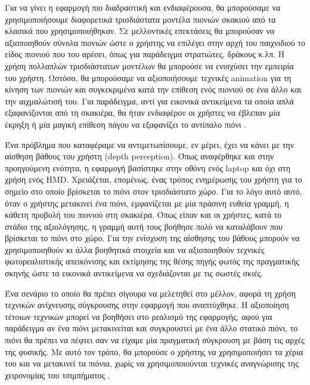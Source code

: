 Για να γίνει η εφαρμογή πιο διαδραστική και ενδιαφέρουσα, θα μπορούσαμε να χρησιμοποιήσουμε διαφορετικά τρισδιάστατα μοντέλα πιονιών σκακιού από τα κλασικά που χρησιμοποιήθηκαν. Σε μελλοντικές επεκτάσεις θα μπορούσαν να αξιοποιηθούν σύνολα πιονιών ώστε ο χρήστης να επιλέγει στην αρχή του παιχνιδιού το είδος πιονιού που του αρέσει, όπως για παράδειγμα στρατιώτες, δράκους κ.λπ.
Η χρήση πολλαπλών τρισδιάστατων μοντέλων θα μπορούσε να ενισχύσει την εμπειρία του χρήστη. Ωστόσο, θα μπορούσαμε να αξιοποιήσουμε τεχνικές animation για τη κίνηση των πιονιών και συγκεκριμένα κατά την επίθεση ενός πιονιού σε ένα άλλο και την αιχμαλώτισή του. Για παράδειγμα, αντί για εικονικά αντικείμενα τα οποία απλά εξαφανίζονται από τη σκακιέρα, θα ήταν ενδιαφέρον οι χρήστες να έβλεπαν μία έκρηξη ή μία μαγική επίθεση πάγου να εξαφανίζει το αντίπαλο πιόνι \cite{harrypotter}.





Ένα πρόβλημα που καταφέραμε να αντιμετωπίσουμε, εν μέρει, έχει να κάνει με την αίσθηση βάθους του χρήστη (depth perception). Όπως αναφέρθηκε και στην προηγούμενη ενότητα, η εφαρμογή βασίστηκε στην οθόνη ενός laptop και όχι στη χρήση ενός HMD. Χρειάζεται, επομένως, ένας τρόπος ενημέρωσης του χρήστη για το σημείο στο οποίο βρίσκεται το πιόνι στον τρισδιάστατο χώρο. Για το λόγο αυτό αυτό, όταν ο χρήστης μετακινεί ένα πιόνι, εμφανίζεται με μία πράσινη ευθεία γραμμή, η κάθετη προβολή του πιονιού στη σκακιέρα. Όπως είπαν και οι χρήστες, κατά το στάδιο της αξιολόγησης, η γραμμή αυτή τους βοήθησε πολύ να καταλάβουν που βρίσκεται το πιόνι στο χώρο. Για την ενίσχυση της αίσθησης του βάθους μπορούν να χρησιμοποιηθούν κι άλλα βοηθητικά στοιχεία και να αξιοποιηθούν τεχνικές φωτορεαλιστικής απεικόνισης και εκτίμησης της θέσης πηγής φωτός της πραγματικής σκηνής \cite{frahm2005markerless} \cite{agusanto2003photorealistic} ώστε τα εικονικά αντικείμενα να σχεδιάζονται με τις σωστές σκιές.


Ένα σενάριο το οποίο θα πρέπει σίγουρα να μελετηθεί στο μέλλον, αφορά τη χρήση τεχνικών ανίχνευσης σύγκρουσης στην εφαρμογή που αναπτύχθηκε. Η αξιοποίηση τέτοιων τεχνικών μπορεί να βοηθήσει στο ρεαλισμό της εφαρμογής, αφού για παράδειγμα αν ένα πιόνι μετακινείται και συγκρουστεί με ένα άλλο στατικό πιόνι, το πιόνι θα πρέπει να πέφτει σαν να είχαμε μία πραγματική σύγκρουση με βάση τις αρχές της φυσικής. Με αυτό τον τρόπο, θα μπορούσε ο χρήστης να χρησιμοποιήσει τα χέρια του και να μετακινεί τα πιόνια, χωρίς να χρησιμοποιούνται τεχνικές αναγνώρισης της χειρονομίας του τσιμπήματος \cite{Song2008}.


